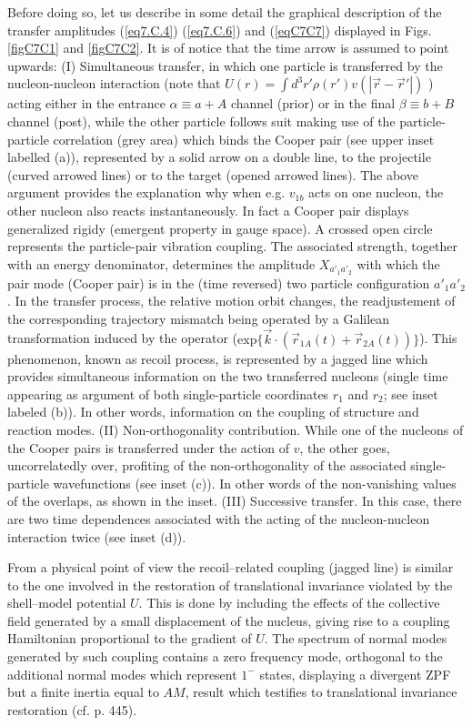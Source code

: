 \begin{subappendices}
Before doing so, let us describe in some detail the graphical description of the transfer amplitudes (\ref{eq7.C.4}) (\ref{eq7.C.6}) and (\ref{eqC7C7}) displayed in Figs. \ref{figC7C1}
and \ref{figC7C2}. It is of notice that the time arrow is assumed to point upwards:
(I) Simultaneous transfer, in which one particle is transferred by the nucleon-nucleon interaction (note that $U(r)=\int d^3 r' \rho(r')v(|\vec r-\vec r'|)$ ) acting either in the entrance $\alpha \equiv a+A$ channel (prior) or in the final $\beta \equiv b + B$ channel (post), while the other particle follows suit making use of the particle-particle correlation (grey area) which binds the Cooper pair (see upper inset labelled (a)), represented by a solid arrow on a double line, to the projectile (curved arrowed lines) or to the target (opened arrowed lines). The above argument provides the explanation why when e.g. $v_{1b}$ acts on one nucleon, the other nucleon also reacts instantaneously. In fact a Cooper pair displays generalized rigidy (emergent property in gauge space).
A crossed open circle represents the particle-pair vibration coupling. The associated strength, together with an energy denominator, determines the amplitude $X_{a'_1 a'_2}$  with which the pair mode (Cooper pair) is in the (time reversed) two particle configuration $a'_1 a'_2$. In the transfer process, the  relative motion orbit changes, the readjustement of the corresponding trajectory mismatch being operated by a Galilean transformation induced by the operator ($\textrm{exp}\{ \vec k \cdot (\vec{r}_{1A}(t)+\vec{r}_{2A}(t))\}$). This phenomenon, known as recoil process, is represented by a jagged line which  provides simultaneous information on the two transferred nucleons (single time appearing as argument of both single-particle coordinates $r_1$ and $r_2$; see inset labeled (b)). In other words, information on the coupling of structure and reaction modes.
(II) Non-orthogonality contribution. While one of the nucleons of the Cooper pairs is transferred under the action of $v$, the other goes, uncorrelatedly over, profiting of the non-orthogonality of the associated single-particle wavefunctions (see inset (c)). In other words of the non-vanishing values of the overlaps, as shown in the inset.
(III) Successive transfer. In this case, there are two time dependences associated with the acting of the nucleon-nucleon interaction twice (see inset (d)). 





From a physical point of view the recoil--related coupling (jagged line) is similar to the one involved in the restoration of translational invariance violated by the shell--model potential $U$. This is done by including the effects of the collective field generated by a small displacement  of the nucleus, giving rise to a coupling Hamiltonian proportional to the gradient of $U$. The spectrum of normal modes generated by such coupling contains a zero frequency mode, orthogonal to the additional normal modes which represent $1^-$ states, displaying a divergent ZPF but a finite inertia equal to $AM$, result which testifies to  translational invariance restoration (cf. \cite{Bohr:75} p. 445). 

\end{subappendices}
